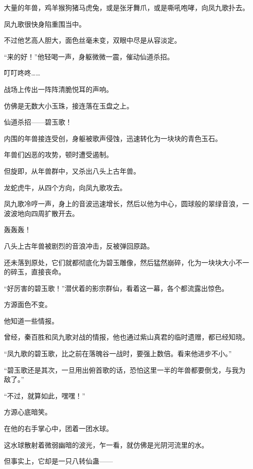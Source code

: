 
\begin{this_body}

大量的年兽，鸡羊猴狗猪马虎兔，或是张牙舞爪，或是嘶吼咆哮，向凤九歌扑去。

凤九歌很快身陷重围当中。

不过他艺高人胆大，面色丝毫未变，双眼中尽是从容淡定。

“来的好！”他轻喝一声，身躯微微一震，催动仙道杀招。

叮叮咚咚……

战场上传出一阵阵清脆悦耳的声响。

仿佛是无数大小玉珠，接连落在玉盘之上。

仙道杀招——碧玉歌！

内围的年兽接连受创，身躯被歌声侵蚀，迅速转化为一块块的青色玉石。

年兽们凶恶的攻势，顿时遭受遏制。

但旋即，从年兽群中，又杀出八头上古年兽。

龙蛇虎牛，从四个方向，向凤九歌攻去。

凤九歌冷哼一声，身上的音波迅速增长，然后以他为中心，圆球般的翠绿音浪，一波波地向四周扩散开去。

轰轰轰！

八头上古年兽被剧烈的音浪冲击，反被弹回原路。

还未落到原处，它们就都彻底化为碧玉雕像，然后猛然崩碎，化为一块块大小不一的碎玉，直接丧命。

“好厉害的碧玉歌！”潜伏着的影宗群仙，看着这一幕，各个都流露出惊色。

方源面色不变。

他知道一些情报。

曾经，秦百胜和凤九歌对战的情报，他也通过紫山真君的临时遗赠，都已经知晓。

“凤九歌的碧玉歌，比之前在落魄谷一战时，要强上数倍。看来他进步不小。”

“碧玉歌还是其次，一旦用出俯首歌的话，恐怕这里一半的年兽都要倒戈，与我为敌了。”

“不过，就算如此，嘿嘿！”

方源心底暗笑。

在他的右手掌心中，团着一团水球。

这水球散射着微弱幽暗的波光，乍一看，就仿佛是光阴河流里的水。

但事实上，它却是一只八转仙蛊——


\end{this_body}
